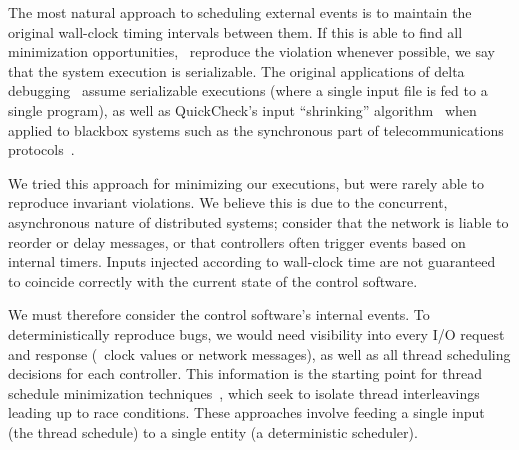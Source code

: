  The most natural approach to scheduling
external events is to maintain the original wall-clock timing intervals
between them.
If this is able to find all minimization opportunities,
\ie~reproduce the violation whenever possible,
we say that the system execution is serializable.
The original applications of delta debugging~\cite{Zeller:1999:YMP:318773.318946} assume serializable executions (where a
single input file is fed to a single program), as well as QuickCheck's input ``shrinking'' algorithm~\cite{claessen2000quickcheck}
when applied to blackbox systems such as the synchronous part of
telecommunications protocols~\cite{arts2006testing}.

We tried this approach for minimizing our executions, but were rarely
able to reproduce invariant violations. We believe this is due
to the concurrent, asynchronous nature of distributed systems; consider that the network
is liable to reorder or delay messages, or that
controllers often trigger events based on internal timers.
Inputs injected according to wall-clock time are not guaranteed to
coincide correctly with the current state of the control software.

We must therefore consider the control software's internal events. To deterministically
reproduce bugs, we would need visibility into every I/O request and response (\eg~clock
values or network messages), as well as all thread scheduling
decisions for each controller. This information is the starting point for thread schedule
minimization
techniques~\cite{choi2002isolating,claessen2009finding,jalbert2010trace},
which seek to isolate thread interleavings leading up to race conditions.
These approaches involve feeding a single input (the thread
schedule) to a single entity (a deterministic scheduler).

